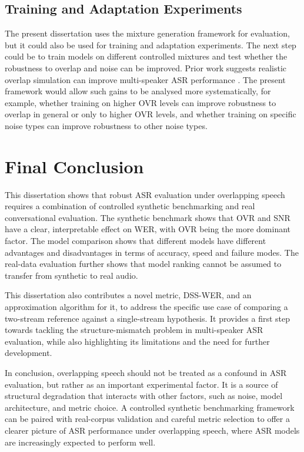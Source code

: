 \subsection{Training and Adaptation Experiments}
The present dissertation uses the mixture generation framework for evaluation, but it could also be used for training and adaptation experiments. The next step could be to train models on different controlled mixtures and test whether the robustness to overlap and noise can be improved. Prior work suggests realistic overlap simulation can improve multi-speaker ASR performance \cite{yang2022simulatingrealisticspeechoverlaps}. The present framework would allow such gains to be analysed more systematically, for example, whether training on higher OVR levels can improve robustness to overlap in general or only to higher OVR levels, and whether training on specific noise types can improve robustness to other noise types.

\section{Final Conclusion}
This dissertation shows that robust ASR evaluation under overlapping speech requires a combination of controlled synthetic benchmarking and real conversational evaluation. The synthetic benchmark shows that OVR and SNR have a clear, interpretable effect on WER, with OVR being the more dominant factor. The model comparison shows that different models have different advantages and disadvantages in terms of accuracy, speed and failure modes. The real-data evaluation further shows that model ranking cannot be assumed to transfer from synthetic to real audio.

This dissertation also contributes a novel metric, DSS-WER, and an approximation algorithm for it, to address the specific use case of comparing a two-stream reference against a single-stream hypothesis. It provides a first step towards tackling the structure-mismatch problem in multi-speaker ASR evaluation, while also highlighting its limitations and the need for further development.

In conclusion, overlapping speech should not be treated as a confound in ASR evaluation, but rather as an important experimental factor. It is a source of structural degradation that interacts with other factors, such as noise, model architecture, and metric choice. A controlled synthetic benchmarking framework can be paired with real-corpus validation and careful metric selection to offer a clearer picture of ASR performance under overlapping speech, where ASR models are increasingly expected to perform well.